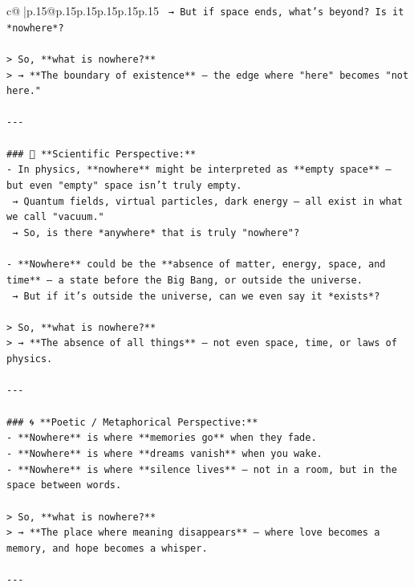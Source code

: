 \documentclass{article}
\begin{document}
{\begin{supertabular}{c@{$\;$}|p{.15\linewidth}@{}p{.15\linewidth}p{.15\linewidth}p{.15\linewidth}p{.15\linewidth}p{.15\linewidth}}
{{{\texttt{  → But if space ends, what’s beyond? Is it *nowhere*?} \\
\\ 
\texttt{> So, **what is nowhere?**  } \\
\texttt{> → **The boundary of existence** — the edge where "here" becomes "not here."} \\
\\ 
\texttt{{-}{-}{-}} \\
\\ 
\texttt{\#\#\# 🌌 **Scientific Perspective:**} \\
\texttt{{-} In physics, **nowhere** might be interpreted as **empty space** — but even "empty" space isn’t truly empty.  } \\
\texttt{  → Quantum fields, virtual particles, dark energy — all exist in what we call "vacuum."  } \\
\texttt{  → So, is there *anywhere* that is truly "nowhere"?} \\
\\ 
\texttt{{-} **Nowhere** could be the **absence of matter, energy, space, and time** — a state before the Big Bang, or outside the universe.  } \\
\texttt{  → But if it’s outside the universe, can we even say it *exists*?} \\
\\ 
\texttt{> So, **what is nowhere?**  } \\
\texttt{> → **The absence of all things** — not even space, time, or laws of physics.} \\
\\ 
\texttt{{-}{-}{-}} \\
\\ 
\texttt{\#\#\# 🌀 **Poetic / Metaphorical Perspective:**} \\
\texttt{{-} **Nowhere** is where **memories go** when they fade.  } \\
\texttt{{-} **Nowhere** is where **dreams vanish** when you wake.  } \\
\texttt{{-} **Nowhere** is where **silence lives** — not in a room, but in the space between words.} \\
\\ 
\texttt{> So, **what is nowhere?**  } \\
\texttt{> → **The place where meaning disappears** — where love becomes a memory, and hope becomes a whisper.} \\
\\ 
\texttt{{-}{-}{-}} \\
}}}
\end{supertabular}}
\end{document}
